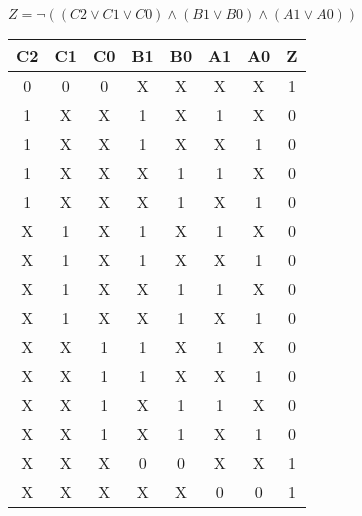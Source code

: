 \begin{center}
    {\(Z = \lnot ((C2 \lor C1 \lor C0) \land (B1 \lor B0) \land (A1 \lor A0)) \)}
    \begin{table}[h] %
        \begin{center}
            \begin{tabular}{|c|c|c|c|c|c|c||c|} \hline
            C2 & C1 & C0 & B1 & B0 & A1 & A0 & Z \\ \hline\hline
            0  & 0  & 0  & X  & X  & X  & X  & 1 \\ \hline
            1  & X  & X  & 1  & X  & 1  & X  & 0 \\ \hline
            1  & X  & X  & 1  & X  & X  & 1  & 0 \\ \hline
            1  & X  & X  & X  & 1  & 1  & X  & 0 \\ \hline
            1  & X  & X  & X  & 1  & X  & 1  & 0 \\ \hline
            X  & 1  & X  & 1  & X  & 1  & X  & 0 \\ \hline
            X  & 1  & X  & 1  & X  & X  & 1  & 0 \\ \hline
            X  & 1  & X  & X  & 1  & 1  & X  & 0 \\ \hline
            X  & 1  & X  & X  & 1  & X  & 1  & 0 \\ \hline
            X  & X  & 1  & 1  & X  & 1  & X  & 0 \\ \hline
            X  & X  & 1  & 1  & X  & X  & 1  & 0 \\ \hline
            X  & X  & 1  & X  & 1  & 1  & X  & 0 \\ \hline
            X  & X  & 1  & X  & 1  & X  & 1  & 0 \\ \hline
            X  & X  & X  & 0  & 0  & X  & X  & 1 \\ \hline
            X  & X  & X  & X  & X  & 0  & 0  & 1 \\ \hline
            \end{tabular}
        \end{center}
    \end{table}
\end{center}
